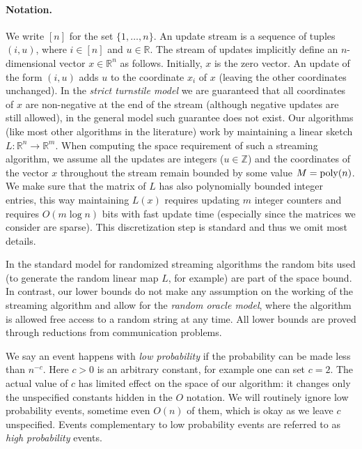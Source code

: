 \paragraph{Notation.}
We write $[n]$ for the set $\{1,\ldots,n\}$.
An update stream is a sequence of tuples $(i,u)$, where $i\in [n]$ 
and $u\in\mathbb R$. The stream of updates implicitly define an $n$-dimensional
vector $x\in\mathbb R^n$ as follows. Initially, $x$ is the zero vector. An update of the form
$(i,u)$ adds $u$ to the coordinate $x_i$ of $x$ (leaving the other coordinates unchanged).
In the {\em strict turnstile model}
we are guaranteed that all coordinates of $x$ are non-negative at the end
of the stream
(although negative updates are still allowed), in the general model such
guarantee does not exist. Our
algorithms (like most other algorithms in the literature) work by maintaining
a linear sketch $L:\mathbb R^n\to\mathbb R^m$.
When computing the space requirement of such a
streaming algorithm, we assume all the updates are integers ($u\in\mathbb Z$)
and the coordinates of the vector $x$ throughout the stream remain bounded by
some value $M=\operatorname{poly}(n)$. We
make sure that the matrix of $L$ has also polynomially bounded
integer entries, this way maintaining $L(x)$ requires updating $m$ integer
counters and requires $O(m\log n)$ bits with fast
update time (especially since the matrices we consider are sparse). This
discretization step is standard and thus we omit most details.

In the standard model for randomized streaming algorithms the random bits used
(to generate the random linear map $L$, for example) are part of the space
bound. In contrast, our lower bounds do not make any assumption on the working of the
streaming algorithm and allow for the {\em random oracle model}, where the
algorithm is allowed free access to a random string at any time. All lower
bounds are proved through reductions from communication problems.

We say an event happens with {\em low probability} if the probability can
be made less than $n^{-c}$. Here $c>0$ is an arbitrary constant, for example
one can set $c=2$. The actual value of $c$ has limited effect on the space
of our algorithm: it changes only the unspecified constants hidden in the $O$
notation. We will routinely ignore low probability events, sometime even
$O(n)$ of them, which is okay as we leave $c$ unspecified.
Events complementary to low probability events are referred to as {\em high
probability} events.

